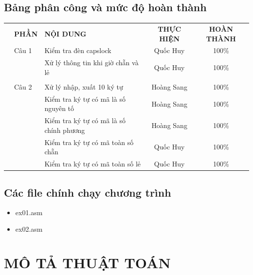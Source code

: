 \documentclass[12pt, a4paper]{article}
\begin{document}
\subsection{Bảng phân công và mức độ hoàn thành}
\begin{table}[h]
    \begin{adjustbox}{width=\columnwidth,center}
        \begin{tabular}{lllcc}
            &\textbf{PHẦN}& \textbf{NỘI DUNG}                       &\textbf{THỰC HIỆN} & \textbf{HOÀN THÀNH} \\
            & Câu 1       & Kiểm tra đèn capslock                   &  Quốc Huy       & 100\%               \\
            &             & Xử lý thông tin khi giờ chẵn và lẻ      & Quốc Huy        & 100\%               \\
            &             &                                         &                 &                     \\ 
            & Câu 2       & Xử lý nhập, xuất 10 ký tự               & Hoàng Sang      & 100\%               \\
            &             & Kiểm tra ký tự có mã là số nguyên tố    & Hoàng Sang      & 100\%               \\
            &             & Kiểm tra ký tự có mã là số chính phương & Hoàng Sang      & 100\%               \\
            &             & Kiểm tra ký tự có mã toàn số chẵn       & Quốc Huy        & 100\%               \\
            &             & Kiểm tra ký tự có mã toàn số lẻ         & Quốc Huy        & 100\%               \\
        \end{tabular}
    \end{adjustbox}
\end{table}


\subsection{Các file chính chạy chương trình}

\begin{itemize}
    \item ex01.asm
    \item ex02.asm
\end{itemize}

\section{MÔ TẢ THUẬT TOÁN}
\end{document}
